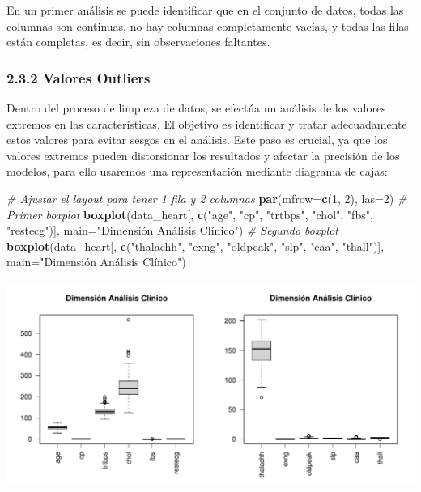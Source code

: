\documentclass[
]{article}
\newenvironment{Shaded}{\begin{snugshade}}{\end{snugshade}}
\newcommand{\AttributeTok}[1]{\textcolor[rgb]{0.13,0.29,0.53}{#1}}
\newcommand{\CommentTok}[1]{\textcolor[rgb]{0.56,0.35,0.01}{\textit{#1}}}
\newcommand{\DecValTok}[1]{\textcolor[rgb]{0.00,0.00,0.81}{#1}}
\newcommand{\FunctionTok}[1]{\textcolor[rgb]{0.13,0.29,0.53}{\textbf{#1}}}
\newcommand{\NormalTok}[1]{#1}
\newcommand{\StringTok}[1]{\textcolor[rgb]{0.31,0.60,0.02}{#1}}
\begin{document}
En un primer análisis se puede identificar que en el conjunto de datos,
todas las columnas son continuas, no hay columnas completamente vacías,
y todas las filas están completas, es decir, sin observaciones
faltantes.

\hypertarget{valores-outliers}{%
\subsubsection{2.3.2 Valores Outliers}\label{valores-outliers}}

Dentro del proceso de limpieza de datos, se efectúa un análisis de los
valores extremos en las características. El objetivo es identificar y
tratar adecuadamente estos valores para evitar sesgos en el análisis.
Este paso es crucial, ya que los valores extremos pueden distorsionar
los resultados y afectar la precisión de los modelos, para ello usaremos
una representación mediante diagrama de cajas:

\begin{Shaded}
\begin{Highlighting}[]
\CommentTok{\# Ajustar el layout para tener 1 fila y 2 columnas}
\FunctionTok{par}\NormalTok{(}\AttributeTok{mfrow=}\FunctionTok{c}\NormalTok{(}\DecValTok{1}\NormalTok{, }\DecValTok{2}\NormalTok{), }\AttributeTok{las=}\DecValTok{2}\NormalTok{)}
\CommentTok{\# Primer boxplot}
\FunctionTok{boxplot}\NormalTok{(data\_heart[, }\FunctionTok{c}\NormalTok{(}\StringTok{"age"}\NormalTok{, }\StringTok{"cp"}\NormalTok{, }\StringTok{"trtbps"}\NormalTok{, }\StringTok{"chol"}\NormalTok{, }\StringTok{"fbs"}\NormalTok{, }\StringTok{"restecg"}\NormalTok{)], }
        \AttributeTok{main=}\StringTok{"Dimensión Análisis Clínico"}\NormalTok{)}
\CommentTok{\# Segundo boxplot}
\FunctionTok{boxplot}\NormalTok{(data\_heart[, }\FunctionTok{c}\NormalTok{(}\StringTok{"thalachh"}\NormalTok{, }\StringTok{"exng"}\NormalTok{, }\StringTok{"oldpeak"}\NormalTok{, }\StringTok{"slp"}\NormalTok{, }\StringTok{"caa"}\NormalTok{, }\StringTok{"thall"}\NormalTok{)], }
        \AttributeTok{main=}\StringTok{"Dimensión Análisis Clínico"}\NormalTok{)}
\end{Highlighting}
\end{Shaded}

\includegraphics{coyolaf_ChristianOyola-PRA2_files/figure-latex/unnamed-chunk-5-1.pdf}
\end{document}
